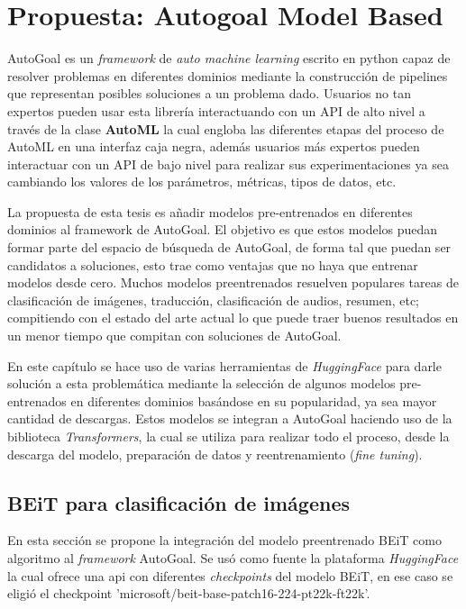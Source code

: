 \chapter{Propuesta: Autogoal Model Based}\label{chapter:proposal}

AutoGoal es un \textit{framework} de \textit{auto machine learning} escrito en python capaz de resolver problemas en diferentes dominios mediante la construcción de pipelines que representan posibles soluciones a un problema dado. Usuarios no tan expertos pueden usar esta librería interactuando con un API de alto nivel a través de la clase \textbf{AutoML} la cual engloba las diferentes etapas del proceso de AutoML en una interfaz caja negra, además usuarios más expertos pueden interactuar con un API de bajo nivel para realizar sus experimentaciones ya sea cambiando los valores de los parámetros, métricas, tipos de datos, etc.

La propuesta de esta tesis es añadir modelos pre-entrenados en diferentes dominios al framework de AutoGoal. El objetivo es que estos modelos puedan formar parte del espacio de búsqueda de AutoGoal, de forma tal que puedan ser candidatos a soluciones, esto trae como ventajas que no haya que entrenar modelos desde cero. Muchos modelos preentrenados resuelven populares tareas de clasificación de imágenes, traducción, clasificación de audios, resumen, etc; compitiendo con el estado del arte actual lo que puede traer buenos resultados en un menor tiempo que compitan con soluciones de AutoGoal.

En este capítulo se hace uso de varias herramientas de \textit{HuggingFace} para darle solución a esta problemática mediante la selección de algunos modelos pre-entrenados en diferentes dominios basándose en su popularidad, ya sea mayor cantidad de descargas. Estos modelos se integran a AutoGoal haciendo uso de la biblioteca \textit{Transformers}, la cual se utiliza para realizar todo el proceso, desde la descarga del modelo, preparación de datos y reentrenamiento (\textit{fine tuning}).

\section{BEiT para clasificación de imágenes}
En esta sección se propone la integración del modelo preentrenado BEiT como algoritmo al \textit{framework} AutoGoal. Se usó como fuente la plataforma \textit{HuggingFace} la cual ofrece una api con diferentes \textit{checkpoints} del modelo BEiT, en ese caso se eligió el checkpoint 'microsoft/beit-base-patch16-224-pt22k-ft22k'.


